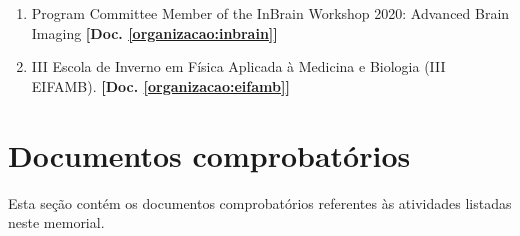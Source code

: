 \documentclass[a4paper,oneside,10pt]{article}
\newcounter{document}%
\begin{document}
\begin{enumerate}
\renewcommand{\labelenumi}{{\large\bfseries\arabic{enumi}.}}

    \item Program Committee Member of the InBrain Workshop 2020: Advanced Brain Imaging \textbf{[Doc. \ref{organizacao:inbrain}]}

    \item III Escola de Inverno em Física Aplicada à Medicina e Biologia (III EIFAMB). \textbf{[Doc. \ref{organizacao:eifamb}]}
    
\end{enumerate}


\clearpage
\appendix
\newpage
\section{Documentos comprobatórios}
Esta seção contém os documentos comprobatórios referentes às atividades listadas neste memorial.
\renewcommand{\thesubsection}{\arabic{subsection}}


\end{document}
